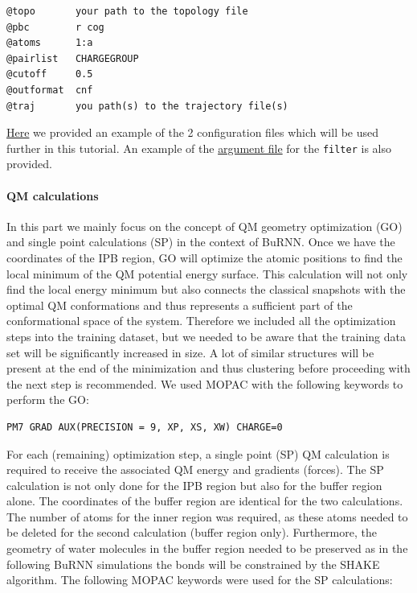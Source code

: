 \begin{lstlisting}[breaklines=true, breakatwhitespace=false]
@topo       your path to the topology file
@pbc        r cog
@atoms      1:a
@pairlist   CHARGEGROUP
@cutoff     0.5
@outformat  cnf
@traj       you path(s) to the trajectory file(s)
\end{lstlisting}

\href{https://github.com/LierB/gromos_tutorial_livecoms/tree/burnn_tutorial_rc/tutorial_files/t_06/train_dataset_tutorial/separated_cnf_files}{Here} we provided an example of the 2 configuration files which will be used further in this tutorial. An example of the \href{https://github.com/LierB/gromos_tutorial_livecoms/blob/burnn_tutorial_rc/tutorial_files/t_06/train_dataset_tutorial/filter/filter_meoh_example.arg}{argument file} for the \texttt{filter} is also provided.

\paragraph{QM calculations}
In this part we mainly focus on the concept of QM geometry optimization (GO) and single point calculations (SP) in the context of BuRNN. Once we have the coordinates of the IPB region, GO will optimize the atomic positions to find the local minimum of the QM potential energy surface. This calculation will not only find the local energy minimum but also connects the classical snapshots with the optimal QM conformations and thus represents a sufficient part of the conformational space of the system. Therefore we included all the optimization steps into the training dataset, but we needed to be aware that the training data set will be significantly increased in size. A lot of similar structures will be present at the end of the minimization and thus clustering before proceeding with the next step is recommended. We used MOPAC with the following keywords to perform the GO:

\begin{lstlisting}[breaklines=true, breakatwhitespace=false]
PM7 GRAD AUX(PRECISION = 9, XP, XS, XW) CHARGE=0
\end{lstlisting}

For each (remaining) optimization step, a single point (SP) QM calculation is required to receive the associated QM energy and gradients (forces). The SP calculation is not only done for the IPB region but also for the buffer region alone. The coordinates of the buffer region are identical for the two calculations. The number of atoms for the inner region was required, as these atoms needed to be deleted for the second calculation (buffer region only). Furthermore, the geometry of water molecules in the buffer region needed to be preserved as in the following BuRNN simulations the bonds will be constrained by the SHAKE algorithm\cite{RYCKAERT1977SHAKE}. The following MOPAC keywords were used for the SP calculations:

